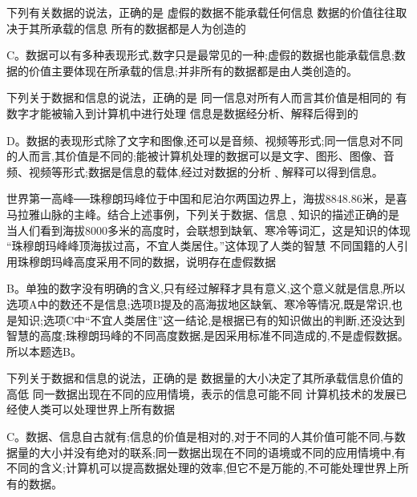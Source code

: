 \begin{groups}


\begin{questions}[rp]

\question
{}下列有关数据的说法，正确的是
{虚假的数据不能承载任何信息}
{数据的价值往往取决于其所承载的信息}
{所有的数据都是人为创造的}
\begin{solution}
C。数据可以有多种表现形式,数字只是最常见的一种;虚假的数据也能承载信息;数据的价值主要体现在所承载的信息;并非所有的数据都是由人类创造的。
\end{solution}

\question
{}下列关于数据和信息的说法，正确的是
{同一信息对所有人而言其价值是相同的}
{有数字才能被输入到计算机中进行处理}
{信息是数据经分析、解释后得到的}
\begin{solution}
D。数据的表现形式除了文字和图像,还可以是音频、视频等形式;同一信息对不同的人而言,其价值是不同的;能被计算机处理的数据可以是文字、图形、图像、音频、视频等形式;数据是信息的载体,经过对数据的分析﹑解释可以得到信息。
\end{solution}

\question
{}世界第一高峰──珠穆朗玛峰位于中国和尼泊尔两国边界上，海拔8848.86米，是喜马拉雅山脉的主峰。结合上述事例，下列关于数据、信息﹑知识的描述正确的是
{当人们看到海拔8000多米的高度时，会联想到缺氧、寒冷等词汇，这是知识的体现}
{“珠穆朗玛峰峰顶海拔过高，不宜人类居住。”这体现了人类的智慧}
{不同国籍的人引用珠穆朗玛峰高度采用不同的数据，说明存在虚假数据}
\begin{solution}
B。单独的数字没有明确的含义,只有经过解释才具有意义,这个意义就是信息,所以选项A中的数还不是信息;选项B提及的高海拔地区缺氧、寒冷等情况,既是常识,也是知识;选项C中“不宜人类居住”这一结论,是根据已有的知识做出的判断,还没达到智慧的高度;珠穆朗玛峰的不同高度数据,是因采用标准不同造成的,不是虚假数据。所以本题选B。
\end{solution}

\question
{}下列关于数据和信息的说法，正确的是
{数据量的大小决定了其所承载信息价值的高低}
{同一数据出现在不同的应用情境，表示的信息可能不同}
{计算机技术的发展已经使人类可以处理世界上所有数据}
\begin{solution}
C。数据、信息自古就有;信息的价值是相对的,对于不同的人其价值可能不同,与数据量的大小并没有绝对的联系;同一数据出现在不同的语境或不同的应用情境中,有不同的含义;计算机可以提高数据处理的效率,但它不是万能的,不可能处理世界上所有的数据。
\end{solution}


\end{questions}
\end{groups}
